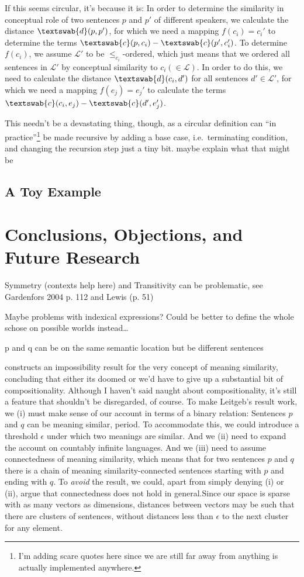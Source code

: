 \documentclass[11pt, a4paper]{scrartcl}
\renewcommand{\i}[1]{\emph{#1}}
\renewcommand{\L}{\mathcal{L}}
\newcommand{\m}[1]{\textswab{#1}}
\begin{document}
If this seems circular, it's because it is: In order to determine the similarity in conceptual role of two sentences $p$ and $p'$ of different speakers, we calculate the distance $\m{d}(p,p')$, for which we need a mapping $f(c_i) = c_i'$ to determine the terms $\m{c}(p,c_i) - \m{c}(p',c_i')$. To determine $f(c_i)$, we assume $\L'$ to be $\leqslant_{c_i}$-ordered, which just means that we ordered all sentences in $\L'$ by conceptual similarity to $c_i (\in \L)$. In order to do this, we need to calculate the distance $\m{d}(c_i,d')$ for all sentences $d' \in \L'$, for which we need a mapping $f(e_j) = e_j'$ to calculate the terms $\m{c}(c_i,e_j) - \m{c}(d',e_j')$.

This needn't be a devastating thing, though, as a circular definition can ``in practice''\footnote{I'm adding scare quotes here since we are still far away from anything is actually implemented anywhere.} be made recursive by adding a base case, i.e.\ terminating condition, and changing the recursion step just a tiny bit. {\color{red} maybe explain what that might be} 

\subsection{A Toy Example}
\section{Conclusions, Objections, and Future Research}

Symmetry (contexts help here) and Transitivity can be problematic, see Gardenfors 2004 p. 112 and Lewis (p. 51)

Maybe problems with indexical expressions? Could be better to define the whole schose on possible worlds instead\ldots

p and q can be on the same semantic location but be different sentences

\textcite{Leitgeb2008-LEIAIR} constructs an impossibility result for the very concept of meaning similarity, concluding that either its doomed or we'd have to give up a substantial bit of compositionality. Although I haven't said naught about compositionality, it's still a feature that shouldn't be disregarded, of course. To make Leitgeb's result work, we (i) must make sense of our account in terms of a binary relation: Sentences $p$ and $q$ can be meaning similar, period. To accommodate this, we could introduce a threshold $\epsilon$ under which two meanings are similar. And we (ii) need to expand the account on countably infinite languages. And we (iii) need to assume connectedness of meaning similarity, which means that for two sentences $p$ and $q$ there is a chain of meaning similarity-connected sentences starting with $p$ and ending with $q$. To \i{avoid} the result, we could, apart from simply denying (i) or (ii), argue that connectedness does not hold in general.Since our space is sparse with as many vectors as dimensions, distances between vectors may be such that there are clusters of sentences, without distances less than $\epsilon$ to the next cluster for any element.
\end{document}
